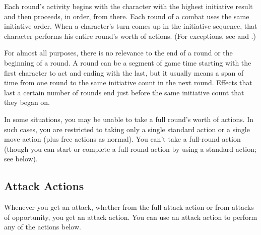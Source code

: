 Each round's activity begins with the character with the highest initiative result and then proceeds, in order, from there. Each round of a combat uses the same initiative order. When a character's turn comes up in the initiative sequence, that character performs his entire round's worth of actions. (For exceptions, see  and .)

For almost all purposes, there is no relevance to the end of a round or the beginning of a round. A round can be a segment of game time starting with the first character to act and ending with the last, but it usually means a span of time from one round to the same initiative count in the next round. Effects that last a certain number of rounds end just before the same initiative count that they began on.

 In some situations, you may be unable to take a full round's worth of actions. In such cases, you are restricted to taking only a single standard action or a single move action (plus free actions as normal). You can't take a full-round action (though you can start or complete a full-round action by using a standard action; see below).

\subsection{Attack Actions}
Whenever you get an attack, whether from the full attack action or from attacks of opportunity, you get an attack action. You can use an attack action to perform any of the actions below.

